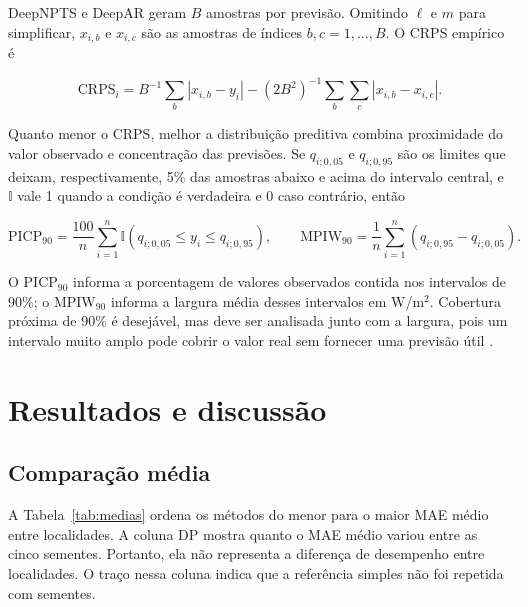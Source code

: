 \documentclass[12pt,a4paper,fleqn]{article}
\begin{document}
DeepNPTS e DeepAR geram $B$ amostras por previsão. Omitindo $\ell$ e $m$ para simplificar, $x_{i,b}$ e $x_{i,c}$ são as amostras de índices $b,c=1,\ldots,B$. O CRPS empírico é

\begin{equation}
 \mathrm{CRPS}_i=B^{-1}\sum_b|x_{i,b}-y_i|-(2B^2)^{-1}\sum_b\sum_c|x_{i,b}-x_{i,c}|.
 \label{eq:crps}
\end{equation}

Quanto menor o CRPS, melhor a distribuição preditiva combina proximidade do valor observado e concentração das previsões. Se $q_{i;0{,}05}$ e $q_{i;0{,}95}$ são os limites que deixam, respectivamente, 5\% das amostras abaixo e acima do intervalo central, e $\mathbb I$ vale 1 quando a condição é verdadeira e 0 caso contrário, então

\begin{equation}
 \mathrm{PICP}_{90}=\frac{100}{n}\sum_{i=1}^{n}\mathbb I(q_{i;0{,}05}\le y_i\le q_{i;0{,}95}),\qquad
 \mathrm{MPIW}_{90}=\frac{1}{n}\sum_{i=1}^{n}(q_{i;0{,}95}-q_{i;0{,}05}).
 \label{eq:intervalos}
\end{equation}

O PICP$_{90}$ informa a porcentagem de valores observados contida nos intervalos de 90\%; o MPIW$_{90}$ informa a largura média desses intervalos em W/m$^2$. Cobertura próxima de 90\% é desejável, mas deve ser analisada junto com a largura, pois um intervalo muito amplo pode cobrir o valor real sem fornecer uma previsão útil \citep{gneiting2007}.

\section{Resultados e discussão}
\label{sec:resultados}

\subsection{Comparação média}

A Tabela~\ref{tab:medias} ordena os métodos do menor para o maior MAE médio entre localidades. A coluna DP mostra quanto o MAE médio variou entre as cinco sementes. Portanto, ela não representa a diferença de desempenho entre localidades. O traço nessa coluna indica que a referência simples não foi repetida com sementes.
\end{document}
